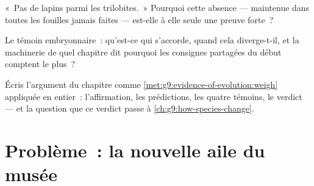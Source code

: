 \begin{exercise}[$\star\star$]\label{exo:g9:evidence-of-evolution:10}
«~Pas de lapins parmi les trilobites.~» Pourquoi cette
absence --- maintenue dans toutes les fouilles jamais
faites --- est-elle à elle seule une preuve forte~?
\end{exercise}

\begin{exercise}[$\star\star$]\label{exo:g9:evidence-of-evolution:11}
Le témoin embryonnaire~: qu'est-ce qui s'accorde, quand
cela diverge-t-il, et la machinerie de quel chapitre dit
pourquoi les consignes partagées du début comptent le plus~?
\end{exercise}

\begin{exercise}[$\star\star\star$]\label{exo:g9:evidence-of-evolution:12}
Écris l'argument du chapitre comme
\cref{met:g9:evidence-of-evolution:weigh} appliquée en
entier~: l'affirmation, les prédictions, les quatre témoins,
le verdict --- et la question que ce verdict passe à
\cref{ch:g9:how-species-change}.
\end{exercise}

\section{Problème~: la nouvelle aile du musée}

